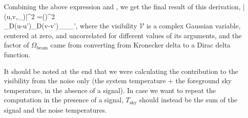 Combining the above expression and \eq{\ref{eq:var_rho}}, we get the final result of this derivation,
\beq
\bga
\langle|(u,v,\theta_\nu)|^2\rangle 
=\left(\right)^2\\
\times\delta_D(u-u')\delta_D(v-v')\delta_{\theta_\nu\theta_{\nu'}},
\ega
\label{eq:Vrms_final}
\eeq
where the visibility $\mathcal{V}$ is a complex Gaussian variable, centered at zero, and uncorrelated for different values of its arguments, and the factor of $\Omega_\text{beam}$ came from converting from Kronecker delta to a  Dirac delta function. 

It should be noted at the end that we were calculating the contribution to the visibility from the noise only (the system temperature + the foreground sky temperature, in the absence of a signal). In case we want to repeat the computation in the presence of a signal, $T_\text{sky}$ should instead be the sum of the signal and the noise temperatures.
